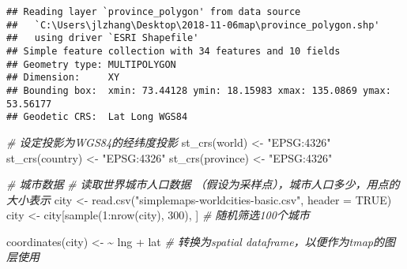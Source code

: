 \documentclass[
]{article}
\newenvironment{Shaded}{\begin{snugshade}}{\end{snugshade}}
\newcommand{\AttributeTok}[1]{\textcolor[rgb]{0.77,0.63,0.00}{#1}}
\newcommand{\CommentTok}[1]{\textcolor[rgb]{0.56,0.35,0.01}{\textit{#1}}}
\newcommand{\ConstantTok}[1]{\textcolor[rgb]{0.00,0.00,0.00}{#1}}
\newcommand{\DecValTok}[1]{\textcolor[rgb]{0.00,0.00,0.81}{#1}}
\newcommand{\ErrorTok}[1]{\textcolor[rgb]{0.64,0.00,0.00}{\textbf{#1}}}
\newcommand{\FunctionTok}[1]{\textcolor[rgb]{0.00,0.00,0.00}{#1}}
\newcommand{\NormalTok}[1]{#1}
\newcommand{\OtherTok}[1]{\textcolor[rgb]{0.56,0.35,0.01}{#1}}
\newcommand{\SpecialCharTok}[1]{\textcolor[rgb]{0.00,0.00,0.00}{#1}}
\newcommand{\StringTok}[1]{\textcolor[rgb]{0.31,0.60,0.02}{#1}}
\begin{document}
\begin{verbatim}
## Reading layer `province_polygon' from data source 
##   `C:\Users\jlzhang\Desktop\2018-11-06map\province_polygon.shp' 
##   using driver `ESRI Shapefile'
## Simple feature collection with 34 features and 10 fields
## Geometry type: MULTIPOLYGON
## Dimension:     XY
## Bounding box:  xmin: 73.44128 ymin: 18.15983 xmax: 135.0869 ymax: 53.56177
## Geodetic CRS:  Lat Long WGS84
\end{verbatim}

\begin{Shaded}
\begin{Highlighting}[]
\CommentTok{\# 设定投影为WGS84的经纬度投影}
\FunctionTok{st\_crs}\NormalTok{(world) }\OtherTok{\textless{}{-}} \StringTok{"EPSG:4326"}
\FunctionTok{st\_crs}\NormalTok{(country) }\OtherTok{\textless{}{-}} \StringTok{"EPSG:4326"}
\FunctionTok{st\_crs}\NormalTok{(province) }\OtherTok{\textless{}{-}} \StringTok{"EPSG:4326"}

\CommentTok{\# 城市数据}
\CommentTok{\# 读取世界城市人口数据 （假设为采样点），城市人口多少，用点的大小表示}
\NormalTok{city }\OtherTok{\textless{}{-}} \FunctionTok{read.csv}\NormalTok{(}\StringTok{"simplemaps{-}worldcities{-}basic.csv"}\NormalTok{, }\AttributeTok{header =} \ConstantTok{TRUE}\NormalTok{)}
\NormalTok{city }\OtherTok{\textless{}{-}}\NormalTok{ city[}\FunctionTok{sample}\NormalTok{(}\DecValTok{1}\SpecialCharTok{:}\FunctionTok{nrow}\NormalTok{(city), }\DecValTok{300}\NormalTok{), ] }\CommentTok{\# 随机筛选100个城市}

\FunctionTok{coordinates}\NormalTok{(city) }\OtherTok{\textless{}{-}} \ErrorTok{\textasciitilde{}}\NormalTok{ lng }\SpecialCharTok{+}\NormalTok{ lat}
\CommentTok{\# 转换为spatial dataframe，以便作为tmap的图层使用}


\end{Highlighting}
\end{Shaded}
\end{document}
